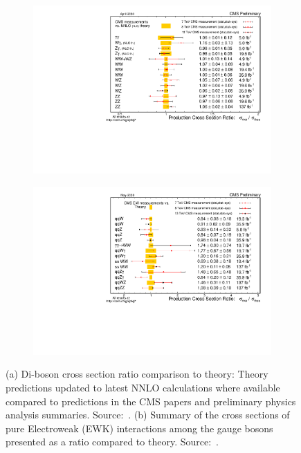 \begin{figure}[htbp]
  \centering
  \begin{subfigure}[htbp]{0.48\textwidth}
    \centering
    \includegraphics[width=\textwidth]{figures_and_tables/theory/sm_vbf_results.pdf}
    \caption{}
    \label{sm_vbf_results}
  \end{subfigure}
  \hfill
  \begin{subfigure}[htbp]{0.48\textwidth}
    \centering
    \includegraphics[width=\textwidth]{figures_and_tables/theory/sm_ewk_results.pdf}
    \caption{}
    \label{sm_ewk_results}
  \end{subfigure}
  \caption{ (a) Di-boson cross section ratio comparison to theory: Theory predictions updated to latest NNLO calculations where available compared to predictions in the CMS papers and preliminary physics analysis summaries. Source:~\cite{cms_sm_xsec_summary}. (b) Summary of the cross sections of pure Electroweak (EWK) interactions among the gauge bosons presented as a ratio compared to theory. Source:~\cite{cms_sm_xsec_summary}.}
\end{figure}

